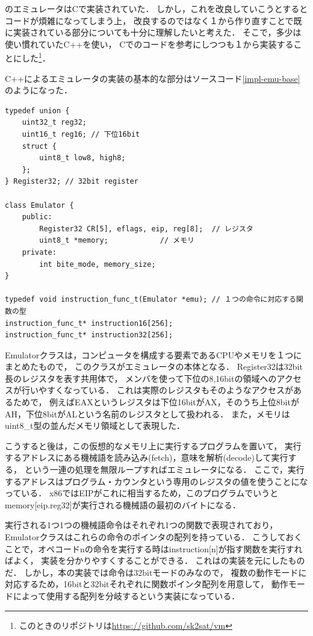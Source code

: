 \documentclass[10pt,a4j]{jsarticle}
\begin{document}
\cite{learn-x86-by-emu}のエミュレータはCで実装されていた．
しかし，これを改良していこうとするとコードが煩雑になってしまう上，
改良するのではなく１から作り直すことで既に実装されている部分についても十分に理解したいと考えた．
そこで，多少は使い慣れていたC++を使い，
Cでのコードを参考にしつつも１から実装することにした\footnote{このときのリポジトリは\url{https://github.com/sk2sat/vm}}．

C++によるエミュレータの実装の基本的な部分はソースコード\ref{impl-emu-base}のようになった．
\begin{lstlisting}[caption=エミュレータの基本的な実装,label=impl-emu-base]
typedef union {
	uint32_t reg32;
	uint16_t reg16; // 下位16bit
	struct {
		uint8_t low8, high8;
	};
} Register32; // 32bit register

class Emulator {
	public:
		Register32 CR[5], eflags, eip, reg[8];	// レジスタ
		uint8_t *memory;			// メモリ
	private:
		int bite_mode, memory_size;
}

typedef void instruction_func_t(Emulator *emu); // １つの命令に対応する関数の型
instruction_func_t* instruction16[256];
instruction_func_t* instruction32[256];
\end{lstlisting}
Emulatorクラスは，コンピュータを構成する要素であるCPUやメモリを１つにまとめたもので，
このクラスがエミュレータの本体となる．
Register32は32bit長のレジスタを表す共用体で，
メンバを使って下位の8,16bitの領域へのアクセスが行いやすくなっている．
これは実際のレジスタもそのようなアクセスがあるためで，
例えばEAXというレジスタは下位16bitがAX，そのうち上位8bitがAH，下位8bitがALという名前のレジスタとして扱われる．
また，メモリはuint8\_t型の並んだメモリ領域として表現した．

こうすると後は，この仮想的なメモリ上に実行するプログラムを置いて，
実行するアドレスにある機械語を読み込み(fetch)，意味を解析(decode)して実行する，
という一連の処理を無限ループすればエミュレータになる．
ここで，実行するアドレスはプログラム・カウンタという専用のレジスタの値を使うことになっている．
x86ではEIPがこれに相当するため，このプログラムでいうとmemory[eip.reg32]が実行される機械語の最初のバイトになる．

実行される1つ1つの機械語命令はそれぞれ1つの関数で表現されており，
Emulatorクラスはこれらの命令のポインタの配列を持っている．
こうしておくことで，オペコードnの命令を実行する時はinstruction[n]が指す関数を実行すればよく，
実装を分かりやすくすることができる．
これは\cite{learn-x86-by-emu}の実装を元にしたものだ．
しかし，本の実装では命令は32bitモードのみなので，
複数の動作モードに対応するため，16bitと32bitそれぞれに関数ポインタ配列を用意して，
動作モードによって使用する配列を分岐するという実装になっている．
\end{document}
